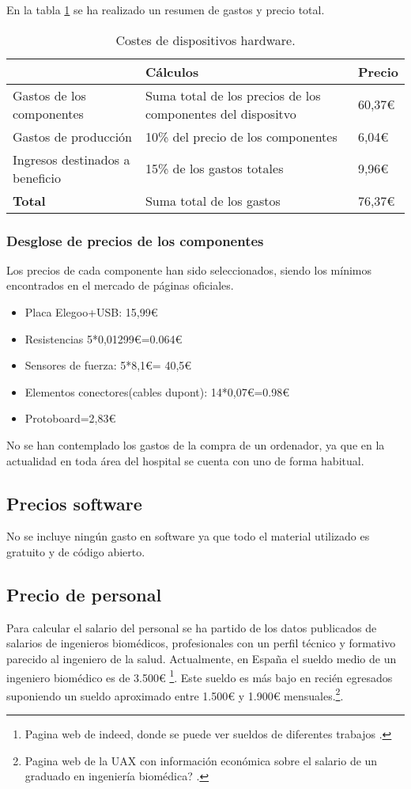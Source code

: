 En la tabla \ref{tab:costes_hardware} se ha realizado un resumen de gastos y precio total. 
\begin{table}[]
\centering
\begin{tabular}{|l|p{8cm}|l|}
\hline
\rowcolor[HTML]{BFBFBF} 
\textbf{} & \textbf{Cálculos} & \textbf{Precio} \\ \hline
Gastos de los componentes & Suma total de los precios de los componentes del dispositvo & 60,37€\\ \hline
Gastos de producción & 10\% del precio de los
 componentes & 6,04€\\ \hline
Ingresos destinados a beneficio & 15\% de los gastos totales & 9,96€\\ \hline
\textbf{Total}& Suma total de los gastos & 76,37€ \\ \hline
\end{tabular}
\caption{Costes de dispositivos hardware.}
\label{tab:costes_hardware}
\end{table}

\subsubsection{\textbf{Desglose de precios de los componentes}}
Los precios de cada componente han sido seleccionados, siendo los mínimos encontrados en el mercado de páginas oficiales.
\begin{itemize}
    \item Placa Elegoo+USB: 15,99€
    \item Resistencias 5*0,01299€=0.064€
    \item Sensores de fuerza: 5*8,1€= 40,5€
    \item Elementos conectores(cables dupont): 14*0,07€=0.98€
    \item Protoboard=2,83€
\end{itemize}
No se han contemplado los gastos de la compra de un ordenador, ya que en la actualidad en toda área del hospital se cuenta con uno de forma habitual. 
\subsection{Precios software}

No se incluye ningún gasto en software ya que todo el material utilizado es gratuito y de código abierto.

\subsection{Precio de personal}
Para calcular el salario del personal se ha partido de los datos publicados de salarios de ingenieros biomédicos, profesionales con un perfil técnico y formativo parecido al ingeniero de la salud.
Actualmente, en España el sueldo medio de un ingeniero biomédico es de 3.500€ \cite{SueldoBioing}\footnote{Pagina web de indeed, donde se puede ver sueldos de diferentes trabajos  \cite{SueldoBioing}.}\cite{SUELDO}. Este sueldo es más bajo en recién egresados suponiendo un sueldo aproximado entre 1.500€ y 1.900€ mensuales.\cite{Sueldo_egresado}\footnote{Pagina web de la UAX con información económica sobre el salario de un graduado en ingeniería biomédica? \cite{Sueldo_egresado}.}.


